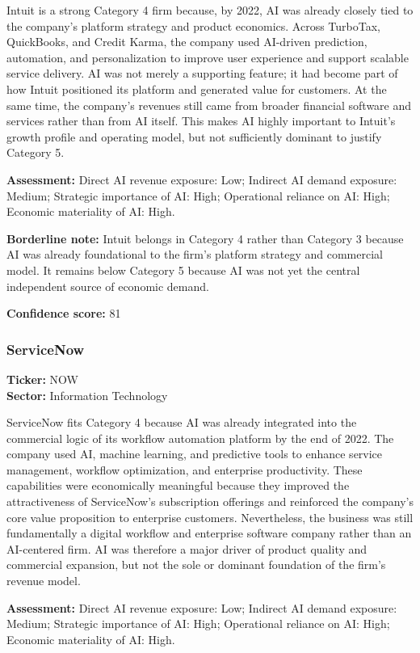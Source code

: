 \documentclass{article}
\begin{document}
Intuit is a strong Category 4 firm because, by 2022, AI was already closely tied to the company’s platform strategy and product economics. Across TurboTax, QuickBooks, and Credit Karma, the company used AI-driven prediction, automation, and personalization to improve user experience and support scalable service delivery. AI was not merely a supporting feature; it had become part of how Intuit positioned its platform and generated value for customers. At the same time, the company’s revenues still came from broader financial software and services rather than from AI itself. This makes AI highly important to Intuit’s growth profile and operating model, but not sufficiently dominant to justify Category 5.

\textbf{Assessment:} Direct AI revenue exposure: Low; Indirect AI demand exposure: Medium; Strategic importance of AI: High; Operational reliance on AI: High; Economic materiality of AI: High.

\textbf{Borderline note:} Intuit belongs in Category 4 rather than Category 3 because AI was already foundational to the firm’s platform strategy and commercial model. It remains below Category 5 because AI was not yet the central independent source of economic demand.

\textbf{Confidence score:} 81

\subsubsection*{ServiceNow}
\textbf{Ticker:} NOW \\
\textbf{Sector:} Information Technology

ServiceNow fits Category 4 because AI was already integrated into the commercial logic of its workflow automation platform by the end of 2022. The company used AI, machine learning, and predictive tools to enhance service management, workflow optimization, and enterprise productivity. These capabilities were economically meaningful because they improved the attractiveness of ServiceNow’s subscription offerings and reinforced the company’s core value proposition to enterprise customers. Nevertheless, the business was still fundamentally a digital workflow and enterprise software company rather than an AI-centered firm. AI was therefore a major driver of product quality and commercial expansion, but not the sole or dominant foundation of the firm’s revenue model.

\textbf{Assessment:} Direct AI revenue exposure: Low; Indirect AI demand exposure: Medium; Strategic importance of AI: High; Operational reliance on AI: High; Economic materiality of AI: High.
\end{document}

